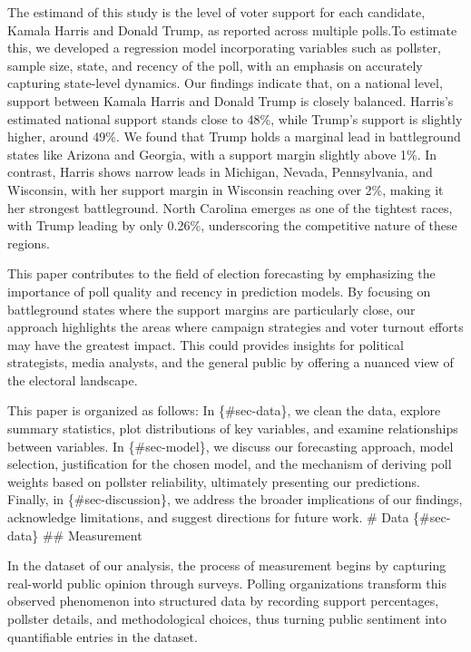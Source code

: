 \documentclass[
  letterpaper,
  DIV=11,
  numbers=noendperiod]{scrartcl}
\begin{document}
The estimand of this study is the level of voter support for each
candidate, Kamala Harris and Donald Trump, as reported across multiple
polls.To estimate this, we developed a regression model incorporating
variables such as pollster, sample size, state, and recency of the poll,
with an emphasis on accurately capturing state-level dynamics. Our
findings indicate that, on a national level, support between Kamala
Harris and Donald Trump is closely balanced. Harris's estimated national
support stands close to 48\%, while Trump's support is slightly higher,
around 49\%. We found that Trump holds a marginal lead in battleground
states like Arizona and Georgia, with a support margin slightly above
1\%. In contrast, Harris shows narrow leads in Michigan, Nevada,
Pennsylvania, and Wisconsin, with her support margin in Wisconsin
reaching over 2\%, making it her strongest battleground. North Carolina
emerges as one of the tightest races, with Trump leading by only 0.26\%,
underscoring the competitive nature of these regions.

This paper contributes to the field of election forecasting by
emphasizing the importance of poll quality and recency in prediction
models. By focusing on battleground states where the support margins are
particularly close, our approach highlights the areas where campaign
strategies and voter turnout efforts may have the greatest impact. This
could provides insights for political strategists, media analysts, and
the general public by offering a nuanced view of the electoral
landscape.

This paper is organized as follows: In \{\#sec-data\}, we clean the
data, explore summary statistics, plot distributions of key variables,
and examine relationships between variables. In \{\#sec-model\}, we
discuss our forecasting approach, model selection, justification for the
chosen model, and the mechanism of deriving poll weights based on
pollster reliability, ultimately presenting our predictions. Finally, in
\{\#sec-discussion\}, we address the broader implications of our
findings, acknowledge limitations, and suggest directions for future
work. \vspace{0.7cm} \# Data \{\#sec-data\} \vspace{0.7cm} \#\#
Measurement

In the dataset of our analysis, the process of measurement begins by
capturing real-world public opinion through surveys. Polling
organizations transform this observed phenomenon into structured data by
recording support percentages, pollster details, and methodological
choices, thus turning public sentiment into quantifiable entries in the
dataset.
\end{document}
